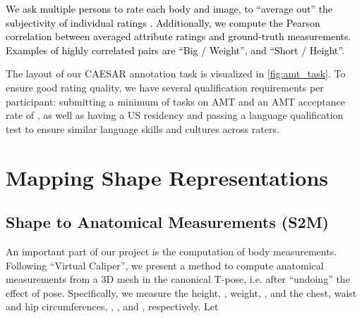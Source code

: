 \documentclass[10pt,twocolumn,letterpaper]{article}
\newcommand{\vcaliper}{``Virtual Caliper''\xspace}
\newcommand{\virtualcaliper}{\vcaliper}
\newcommand{\tpose}{\mbox{T-pose}\xspace}
\newcommand{\threeD}{3D\xspace}
\newcommand{\amt}{\mbox{AMT}\xspace}
\newcommand{\caesar}{\mbox{CAESAR}\xspace}
\renewcommand{\ie}{\mbox{i.e.}\xspace}
\newcommand{\cameraready}[1]{\textcolor{Fuchsia}{{#1}}\xspace}
\renewcommand{\cameraready}[1]{\textcolor{black}{{#1}}\xspace}
\begin{document}
\begin{appendices}
\cameraready{We ask multiple persons to rate each body and image, to “average out” the subjectivity of individual ratings \cite{Streuber:SIGGRAPH:2016}. Additionally, we compute the Pearson correlation between averaged attribute ratings and ground-truth measurements. Examples of highly correlated pairs are “Big / Weight”, and “Short / Height”.}

The layout of our \caesar annotation task is visualized in \cref{fig:amt_task}. 
To ensure good rating quality, we have several qualification requirements per participant: 
submitting a minimum of  tasks on \amt and an \amt acceptance rate of , as well as having a US residency and passing a language qualification test to ensure similar language skills and cultures across raters.


\begin{figure*}[t]
    \centering
    \caption{Layout of the \amt task for a male subject.
        \textbf{Left:}      the \threeD body mesh in A-pose.
        \textbf{Right:}     the attributes and ratings buttons.
    }
    \label{fig:amt_task}
\end{figure*}
  
\section{Mapping Shape Representations}
\subsection{Shape to Anatomical Measurements (S2M)}
\label{supmat:sec:virtual_measurements}

\newcommand{\headvert}[0]{v_{\text{head}}}
\newcommand{\heelvertex}[0]{v_{\text{left heel}}}
\newcommand{\chestvertex}[0]{v_{\text{chest}}}
\newcommand{\waistvertex}[0]{v_{\text{waist}}}
\newcommand{\hipvertex}[0]{v_{\text{hip}}}

An important part of our project is the
computation of body measurements.
Following \virtualcaliper \cite{pujades2019virtual}, we present a method to compute anatomical measurements from a \threeD mesh in the canonical \tpose, \ie after ``undoing'' the effect of pose.
Specifically, we measure the height, , weight, , and the chest, waist and hip circumferences, , , and , respectively.
Let


\end{appendices}
\end{document}
